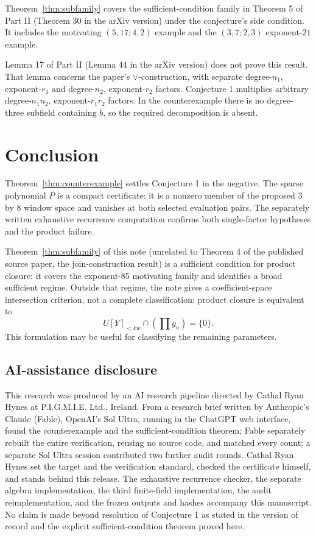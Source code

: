 \documentclass[11pt]{article}
\begin{document}
Theorem~\ref{thm:subfamily} covers the sufficient-condition family in
Theorem 5 of Part II (Theorem 30 in the arXiv version) under the
conjecture's side condition.  It includes
the motivating \((5,17;4,2)\) example and the
\((3,7;2,3)\) exponent-\(21\) example.

Lemma 17 of Part II (Lemma 44 in the arXiv version) does not prove
this result.  That lemma concerns the
paper's \(\vee\)-construction, with separate degree-\(n_1\),
exponent-\(r_1\) and degree-\(n_2\), exponent-\(r_2\) factors.
Conjecture 1 multiplies arbitrary degree-\(n_1n_2\),
exponent-\(r_1r_2\) factors.  In the counterexample there is no
degree-three subfield containing \(b\), so the required decomposition is
absent.

\section{Conclusion}

Theorem~\ref{thm:counterexample} settles Conjecture 1 in the negative.
The sparse polynomial \(P\) is a compact certificate: it is a
nonzero member of the proposed \(3\) by \(8\) window space and vanishes at
both selected evaluation pairs.  The separately written exhaustive recurrence computation confirms
both single-factor hypotheses and the product failure.

Theorem~\ref{thm:subfamily} of this note (unrelated to Theorem 4 of
the published source paper, the join-construction result) is a
sufficient condition for product closure: it covers the exponent-85
motivating family and identifies a broad sufficient regime.  Outside
that regime, the note gives a coefficient-space intersection
criterion, not a complete classification: product closure is
equivalent to
\[
 U[Y]_{<kw}\cap(\prod g_u)=\{0\}.
\]
This formulation may be useful for classifying the remaining parameters.

\subsection*{AI-assistance disclosure}

This research was produced by an AI research pipeline directed by
Cathal Ryan Hynes at P.I.G.M.I.E. Ltd., Ireland.  From a research
brief written by Anthropic's Claude (Fable), OpenAI's Sol Ultra, running
in the ChatGPT web interface, found the counterexample and the
sufficient-condition theorem; Fable separately rebuilt the entire
verification, reusing no source code, and matched every count; a separate Sol Ultra
session contributed two further audit rounds.  Cathal Ryan Hynes set the
target and the verification standard, checked the certificate himself,
and stands behind this release.  The exhaustive recurrence checker, the separate algebra
implementation, the third finite-field implementation, the audit
reimplementation, and the frozen outputs and hashes accompany this
manuscript.  No claim is made beyond resolution of Conjecture 1 as
stated in the version of record and the explicit sufficient-condition
theorem proved here.
\end{document}
